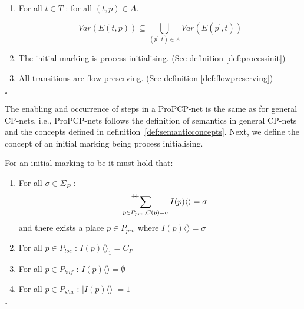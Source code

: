 \begin{definition}
\begin{enumerate}
\item For all $t \in T$ : for all $(t, p) \in A$.

\begin{equation*}
Var(E(t, p)) \subseteq \bigcup_{(p^{\prime}, t) \in A} Var(E(p^{\prime}, t))
\end{equation*}

\item The initial marking is process initialising. (See definition \ref{def:processinit})
\item All transitions are flow preserving. (See definition \ref{def:flowpreserving})

\end{enumerate}
\flushright $\square$
\end{definition}

\noindent
The enabling and occurrence of steps in a ProPCP-net is the same as for general CP-nets, i.e., ProPCP-nets follows the definition of semantics in general CP-nets and the concepts defined in definition~\ref{def:semanticconcepts}. Next, we define the concept of an initial marking being process initialising.

\begin{definition}
\label{def:processinit}
For an initial marking to be  it must hold that:

\begin{enumerate}
\item For all $\sigma \in \Sigma_{P} $ :
\begin{equation*}
\sideset{^{+\hspace*{-0.25em}+}}{}\sum_{p \in P_{pro}, C(p) = \sigma} I(p)\langle \rangle = \sigma
\end{equation*}
and there exists a place $p \in P_{pro}$ where $I(p)\langle \rangle = \sigma$


\item For all $p \in P_{loc}$ : $I(p)\langle \rangle_{1} = C_{P}$
\item For all $p \in P_{buf}$ : $I(p)\langle \rangle = \emptyset$
\item For all $p \in P_{sha}$ : $\mid I(p)\langle \rangle \mid = 1$
\end{enumerate}
\flushright $\square$
\end{definition}

